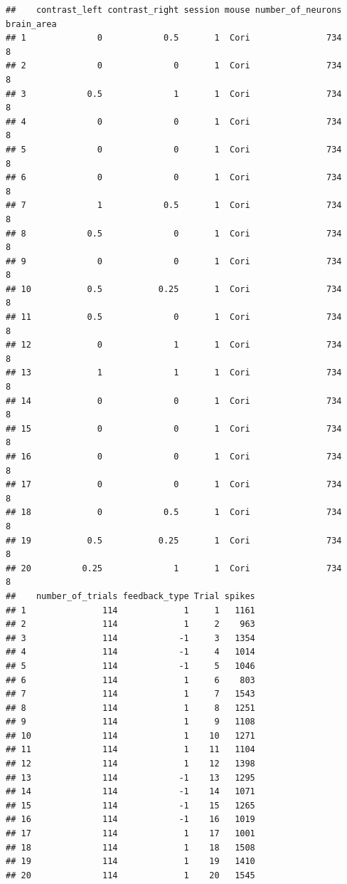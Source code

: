 \documentclass[
]{article}
\begin{document}
\begin{verbatim}
##    contrast_left contrast_right session mouse number_of_neurons brain_area
## 1              0            0.5       1  Cori               734          8
## 2              0              0       1  Cori               734          8
## 3            0.5              1       1  Cori               734          8
## 4              0              0       1  Cori               734          8
## 5              0              0       1  Cori               734          8
## 6              0              0       1  Cori               734          8
## 7              1            0.5       1  Cori               734          8
## 8            0.5              0       1  Cori               734          8
## 9              0              0       1  Cori               734          8
## 10           0.5           0.25       1  Cori               734          8
## 11           0.5              0       1  Cori               734          8
## 12             0              1       1  Cori               734          8
## 13             1              1       1  Cori               734          8
## 14             0              0       1  Cori               734          8
## 15             0              0       1  Cori               734          8
## 16             0              0       1  Cori               734          8
## 17             0              0       1  Cori               734          8
## 18             0            0.5       1  Cori               734          8
## 19           0.5           0.25       1  Cori               734          8
## 20          0.25              1       1  Cori               734          8
##    number_of_trials feedback_type Trial spikes
## 1               114             1     1   1161
## 2               114             1     2    963
## 3               114            -1     3   1354
## 4               114            -1     4   1014
## 5               114            -1     5   1046
## 6               114             1     6    803
## 7               114             1     7   1543
## 8               114             1     8   1251
## 9               114             1     9   1108
## 10              114             1    10   1271
## 11              114             1    11   1104
## 12              114             1    12   1398
## 13              114            -1    13   1295
## 14              114            -1    14   1071
## 15              114            -1    15   1265
## 16              114            -1    16   1019
## 17              114             1    17   1001
## 18              114             1    18   1508
## 19              114             1    19   1410
## 20              114             1    20   1545
\end{verbatim}
\end{document}
